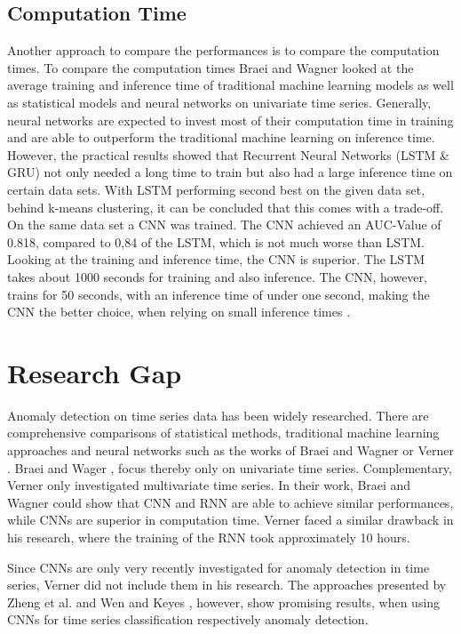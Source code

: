 \subsection{Computation Time}
Another approach to compare the performances is to compare the computation times. To compare the computation times Braei and Wagner \parencite*{Braei2020} looked at the average training and inference time of traditional machine learning models as well as  statistical models and neural networks on univariate time series. Generally, neural networks are expected to invest most of their computation time in training and are able to outperform the traditional machine learning on inference time. However, the practical results showed that Recurrent Neural Networks (LSTM \& GRU) not only needed a long time to train but also had a large inference time on certain data sets. With LSTM performing second best on the given data set, behind k-means clustering, it can be concluded that this comes with a trade-off. On the same data set a CNN was trained. The CNN achieved an AUC-Value of 0.818, compared to 0,84 of the LSTM, which is not much worse than LSTM. Looking at the training and inference time, the CNN is superior. The LSTM takes about 1000 seconds for training and also inference. The CNN, however, trains for 50 seconds, with an inference time of under one second, making the CNN the better choice, when relying on small inference times \parencite{Braei2020}.

\section{Research Gap}
Anomaly detection on time series data has been widely researched. There are comprehensive comparisons of statistical methods, traditional machine learning approaches and neural networks such as the works of Braei and Wagner \parencite*{Braei2020} or Verner \parencite*{Verner2019}. Braei and Wager \parencite*{Braei2020}, focus thereby only on univariate time series. Complementary, Verner \parencite*{Verner2019} only investigated multivariate time series. In their work, Braei and Wagner \parencite*{Braei2020} could show that CNN and RNN are able to achieve similar performances, while CNNs are superior in computation time. Verner \parencite*{Verner2019} faced a similar drawback in his research, where the training of the RNN took approximately 10 hours. 

Since CNNs are only very recently investigated for anomaly detection in time series, Verner \parencite*{Verner2019} did not include them in his research. The approaches presented by Zheng et al. \parencite*{Zheng2014} and Wen and Keyes \parencite*{Wen2019}, however, show promising results, when using CNNs for time series classification respectively anomaly detection. 

